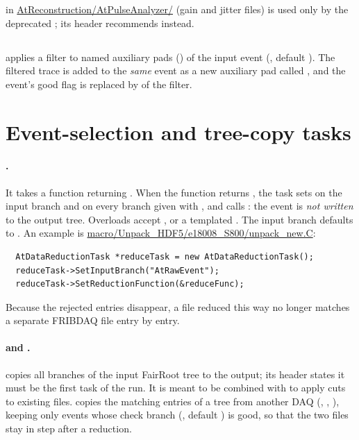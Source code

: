  in \url{AtReconstruction/AtPulseAnalyzer/} (gain and jitter files) is used
only by the deprecated ; its header recommends  instead.

\subsection{}

 applies a filter to named auxiliary pads ()
of the input event (, default ). The filtered trace is
added to the \emph{same} event as a new auxiliary pad called , and the event's
good flag is replaced by  of the filter.

\section{Event-selection and tree-copy tasks}
\label{sec:unp-tasks}

\paragraph{.} It takes a function returning . When the
function returns , the task sets  on the input branch and on every
branch given with , and calls : the event
is \emph{not written} to the output tree. Overloads accept ,
 or a templated . The input
branch defaults to . An example is \url{macro/Unpack_HDF5/e18008_S800/unpack_new.C}:
\begin{verbatim}
  AtDataReductionTask *reduceTask = new AtDataReductionTask();
  reduceTask->SetInputBranch("AtRawEvent");
  reduceTask->SetReductionFunction(&reduceFunc);
\end{verbatim}
Because the rejected entries disappear, a file reduced this way no longer matches a separate
FRIBDAQ file entry by entry.

\paragraph{ and .}  copies all
branches of the input FairRoot tree to the output; its header states it must be the first task of
the run. It is meant to be combined with  to apply cuts to existing files.
 copies the matching entries of a tree from another DAQ (,
, ), keeping only events whose check branch
(, default ) is good, so that the two files stay in
step after a reduction.

